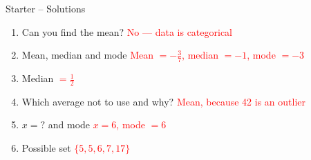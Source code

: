 \documentclass{beamer}
\begin{document}
\begin{frame}{Starter -- Solutions}
\vspace{-0.8em}

\footnotesize
\begin{enumerate}\itemsep2pt
  \item Can you find the mean?  
        \textcolor{red}{No — data is categorical}
  \item Mean, median and mode  
        \textcolor{red}{Mean $=-\frac{3}{7}$, median $=-1$, mode $=-3$}
  \item Median  
        \textcolor{red}{$=\frac{1}{2}$}
  \item Which average not to use and why?  
        \textcolor{red}{Mean, because 42 is an outlier}
  \item $x=?$ and mode  
        \textcolor{red}{$x=6$, mode $=6$}
  \item Possible set  
        \textcolor{red}{$\{5,5,6,7,17\}$}
\end{enumerate}
\end{frame}
\end{document}
